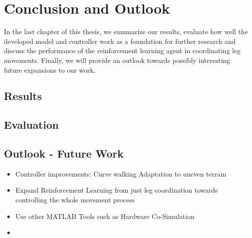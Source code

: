 \chapter{Conclusion and Outlook}
\label{ch:conclusion}

In the last chapter of this thesis, we summarize our results, evaluate how well the developed model and controller work as a foundation for further research and discuss the performance of the reinforcement learning agent in coordinating leg movements.
Finally, we will provide an outlook towards possibly interesting future expansions to our work.

\section{Results}

\section{Evaluation}

\section{Outlook - Future Work}



\begin{itemize}
	
	\item Controller improvements:
		\subitem Curve walking
		\subitem Adaptation to uneven terrain
		\subitem 
	
	\item Expand Reinforcement Learning from just leg coordination towards controlling the whole movement process
	
	\item Use other MATLAB Tools such as Hardware Co-Simulation
	
	\item 
	
\end{itemize}